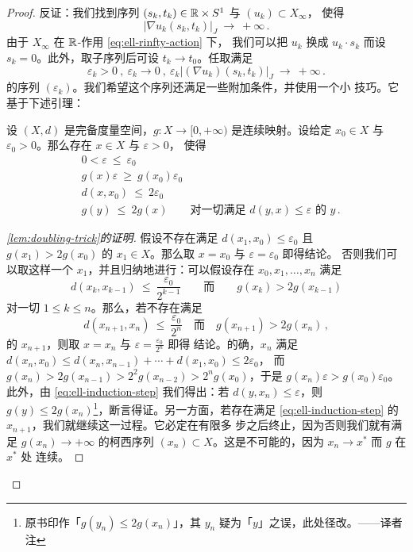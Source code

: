 \begin{proof}
反证：我们找到序列 $(s_{k},t_{k})\in\mathbb{R}\times S^{1}$ 与 $(u_{k})\subset X_{\infty}$，%
使得
\[
\bigl|\nabla u_{k}(s_{k},t_{k})\bigr|_{J}\ \longrightarrow\ +\infty\,.
\]
由于 $X_{\infty}$ 在 $\mathbb{R}$-作用 \eqref{eq:ell-rinfty-action} 下\trInvariant，%
我们可以把 $u_{k}$ 换成 $u_{k}\cdot s_{k}$ 而设 $s_{k}=0$。此外，取子序列后可设%
$t_{k}\to t_{0}$。任取满足
\begin{equation}\label{eq:ell-epsilon-blowup}
\varepsilon_{k}>0\ ,\ \varepsilon_{k}\to0\ ,\ \varepsilon_{k}\bigl|(\nabla u_{k})(s_{k},t_{k})\bigr|_{J}\ \longrightarrow\ +\infty\,.
\end{equation}
的序列 $(\varepsilon_{k})$。我们希望这个序列还满足一些附加条件，并使用一个小%
技巧。它基于下述引理：

\begin{lemma}\label{lem:doubling-trick}
设 $(X,d)$ 是完备度量空间，$g:X\to[0,+\infty)$ 是连续映射。设给定%
$x_{0}\in X$ 与 $\varepsilon_{0}>0$。那么存在 $x\in X$ 与 $\varepsilon>0$，%
使得
\[
\begin{aligned}
&0<\varepsilon\ \leq\ \varepsilon_{0}\\
&g(x)\varepsilon\ \geq\ g(x_{0})\varepsilon_{0}\\
&d(x,x_{0})\ \leq\ 2\varepsilon_{0}\\
&g(y)\ \leq\ 2g(x)\qquad\text{对一切满足 }d(y,x)\leq\varepsilon\text{ 的 }y\,.
\end{aligned}
\]
\end{lemma}

\begin{proof}[\cref*{lem:doubling-trick}的证明]
假设不存在满足 $d(x_{1},x_{0})\leq\varepsilon_{0}$ 且 $g(x_{1})>2g(x_{0})$ 的%
$x_{1}\in X$。那么取 $x=x_{0}$ 与 $\varepsilon=\varepsilon_{0}$ 即得结论。%
否则我们可以取这样一个 $x_{1}$，并且归纳地进行：可以假设存在%
$x_{0},x_{1},\ldots,x_{n}$ 满足
\[
d(x_{k},x_{k-1})\ \leq\ \frac{\varepsilon_{0}}{2^{k-1}}\qquad\text{而}\qquad g(x_{k})>2g(x_{k-1})
\]
对一切 $1\leq k\leq n$。那么，若不存在满足
\begin{equation}\label{eq:ell-induction-step}
d(x_{n+1},x_{n})\ \leq\ \frac{\varepsilon_{0}}{2^{n}}\quad\text{而}\quad g(x_{n+1})>2g(x_{n})\,,
\end{equation}
的 $x_{n+1}$，则取 $x=x_{n}$ 与 $\varepsilon=\frac{\varepsilon_{0}}{2^{n}}$ 即得%
结论。的确，$x_{n}$ 满足%
$d(x_{n},x_{0})\leq d(x_{n},x_{n-1})+\cdots+d(x_{1},x_{0})\leq2\varepsilon_{0}$，%
而 $g(x_{n})>2g(x_{n-1})>2^{2}g(x_{n-2})>2^{n}g(x_{0})$，于是%
$g(x_{n})\varepsilon>g(x_{0})\varepsilon_{0}$。此外，由%
\eqref{eq:ell-induction-step} 我们得出：若 $d(y,x_{n})\leq\varepsilon$，则%
$g(y)\leq2g(x_{n})$\footnote{原书印作「$g(y_{n})\leq 2g(x_{n})$」，其 $y_{n}$ 疑为「$y$」之误，此处径改。——译者注}，断言得证。另一方面，若存在满足%
\eqref{eq:ell-induction-step} 的 $x_{n+1}$，我们就继续这一过程。它必定在有限多%
步之后终止，因为否则我们就有满足 $g(x_{n})\to+\infty$ 的柯西序列%
$(x_{n})\subset X$。这是不可能的，因为 $x_{n}\to x^{*}$ 而 $g$ 在 $x^{*}$ 处%
连续。
\end{proof}


\end{proof}
